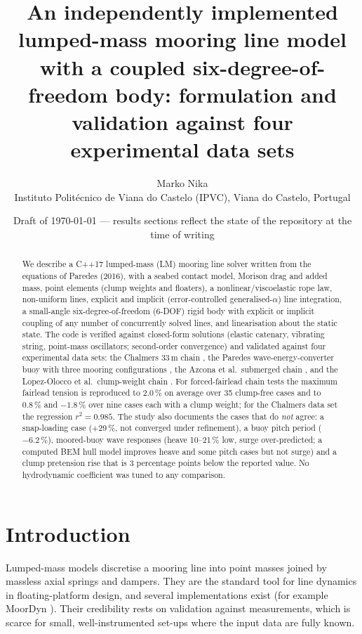 \documentclass[11pt,a4paper]{article}
\title{An independently implemented lumped-mass mooring line model with a coupled six-degree-of-freedom body: formulation and validation against four experimental data sets}
\author{Marko Nika\\ \small Instituto Polit\'ecnico de Viana do Castelo (IPVC), Viana do Castelo, Portugal\\ \small \todo{e-mail}}
\date{\small Draft of \today{} --- results sections reflect the state of the repository at the time of writing}
\begin{document}
\maketitle

\begin{abstract}
We describe a C++17 lumped-mass (LM) mooring line solver written from the equations of Paredes (2016), with a seabed contact model, Morison drag and added mass, point elements (clump weights and floaters), a nonlinear/viscoelastic rope law, non-uniform lines, explicit and implicit (error-controlled generalised-$\alpha$) line integration, a small-angle six-degree-of-freedom (6-DOF) rigid body with explicit or implicit coupling of any number of concurrently solved lines, and linearisation about the static state. The code is verified against closed-form solutions (elastic catenary, vibrating string, point-mass oscillators; second-order convergence) and validated against four experimental data sets: the Chalmers 33\,m chain \cite{bergdahl2016}, the Paredes wave-energy-converter buoy with three mooring configurations \cite{paredes2016}, the Azcona et al.\ submerged chain \cite{azcona2017}, and the Lopez-Olocco et al.\ clump-weight chain \cite{lopezolocco2022}. For forced-fairlead chain tests the maximum fairlead tension is reproduced to $2.0\,\%$ on average over 35 clump-free cases and to $0.8\,\%$ and $-1.8\,\%$ over nine cases each with a clump weight; for the Chalmers data set the regression $r^2=0.985$. The study also documents the cases that do \emph{not} agree: a snap-loading case (+29\,\%, not converged under refinement), a buoy pitch period ($-6.2\,\%$), moored-buoy wave responses (heave 10--21\,\% low, surge over-predicted; a computed BEM hull model improves heave and some pitch cases but not surge) and a clump pretension rise that is $3$ percentage points below the reported value. No hydrodynamic coefficient was tuned to any comparison.
\end{abstract}

\section{Introduction}
Lumped-mass models discretise a mooring line into point masses joined by massless axial springs and dampers. They are the standard tool for line dynamics in floating-platform design, and several implementations exist (for example MoorDyn \cite{hall2015}). Their credibility rests on validation against measurements, which is scarce for small, well-instrumented set-ups where the input data are fully known.
\end{document}
